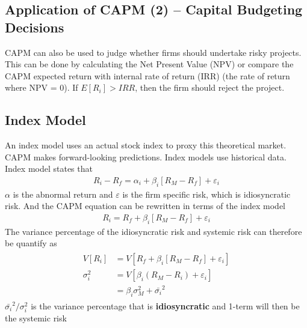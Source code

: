 \begin{multicols}{2}
\subsection{Application of CAPM (2) -- Capital Budgeting Decisions}
CAPM can also be used to judge whether firms should undertake risky projects. This can be done by calculating the Net Present Value (NPV) or compare the CAPM expected return with internal rate of return (IRR) (the rate of return where NPV = 0). If $E[R_i]>IRR$, then the firm should reject the project. 

\subsection{Index Model}
An index model uses an actual stock index to proxy this theoretical market. CAPM makes forward-looking predictions. Index models use historical data. Index model states that
\begin{gather*}
    R_i-R_f = \alpha_i+\beta_i[R_M-R_f]+\varepsilon_i
\end{gather*} 
$\alpha$ is the abnormal return and $\varepsilon$ is the firm specific risk, which is idiosyncratic risk. And the CAPM equation can be rewritten in terms of the index model
\begin{gather*}
    \boxed{R_i = R_f+\beta_i[R_M-R_f]+\varepsilon_i}
\end{gather*}
The variance percentage of the idiosyncratic risk and systemic risk can therefore be quantify as 
\begin{gather*}
    \begin{split}
        V[R_i] &= V[R_f+\beta_i[R_M-R_f]+\varepsilon_i]\\
        \sigma_i^2 &= V[\beta_i(R_M-R_i)+\varepsilon_i]\\
        &= \beta_i\sigma_M^2 + \bar{\sigma_i}^2
    \end{split}
\end{gather*}
$\boxed{\bar{\sigma_i}^2/\sigma_i^2}$ is the variance percentage that is \textbf{idiosyncratic} and 1-term will then be the systemic risk








\end{multicols}